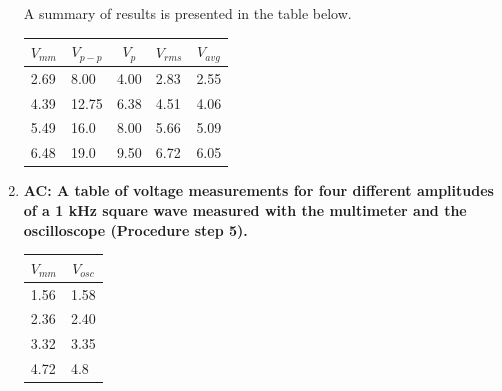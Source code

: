 \begin{enumerate}[resume]
A summary of results is presented in the table below.

\begin{table}[ht]
\center
\begin{tabular}{|l|l|l|l|l|}
\hline
\multicolumn{1}{|c|}{$V_{mm}$} & \multicolumn{1}{c|}{$V_{p-p}$} & \multicolumn{1}{c|}{$V_p$} & \multicolumn{1}{c|}{$V_{rms}$} & \multicolumn{1}{c|}{$V_{avg}$} \\ \hline
2.69                           & 8.00                           & 4.00                       & 2.83                           & 2.55                           \\ \hline
4.39                           & 12.75                          & 6.38                       & 4.51                           & 4.06                           \\ \hline
5.49                           & 16.0                           & 8.00                       & 5.66                           & 5.09                           \\ \hline
6.48                           & 19.0                           & 9.50                       & 6.72                           & 6.05                           \\ \hline
\end{tabular}
\label{tab:accg5}
\end{table}

\item {\bf AC: A table of voltage measurements for four different amplitudes of a 1 kHz square wave measured with the multimeter and the oscilloscope (Procedure step 5).}\newline

\begin{table}[ht]
\center
\begin{tabular}{|l|l|}
\hline
\multicolumn{1}{|c|}{$V_{mm}$} & \multicolumn{1}{c|}{$V_{osc}$} \\ \hline
1.56                           & 1.58                           \\ \hline
2.36                           & 2.40                           \\ \hline
3.32                           & 3.35                           \\ \hline
4.72                           & 4.8                            \\ \hline
\end{tabular}
\label{tab:accg6}
\end{table}


\end{enumerate}
